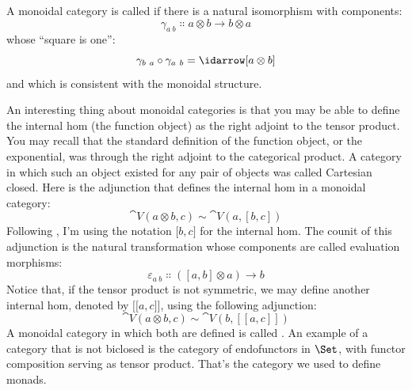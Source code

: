 \begin{figure}[H]
\centering
{}
\end{figure}

\begin{figure}[H]
\centering
{}
\end{figure}

\noindent
A monoidal category is called  if there is a natural
isomorphism with components:
\[\gamma_{a\ b} \Colon a \otimes b \to b \otimes a\]
whose ``square is one'':
\[\gamma_{b\ a} \circ \gamma_{a\ b} = \idarrow[a \otimes b]\]
and which is consistent with the monoidal structure.

An interesting thing about monoidal categories is that you may be able
to define the internal hom (the function object) as the right adjoint to
the tensor product. You may recall that the standard definition of the
function object, or the exponential, was through the right adjoint to
the categorical product. A category in which such an object existed for
any pair of objects was called Cartesian closed. Here is the adjunction
that defines the internal hom in a monoidal category:
\[\cat{V}(a \otimes b, c) \sim \cat{V}(a, [b, c])\]
Following
, I'm using the notation ${[}b, c{]}$ for the internal
hom. The counit of this adjunction is the natural transformation whose
components are called evaluation morphisms:
\[\varepsilon_{a\ b} \Colon ([a, b] \otimes a) \to b\]
Notice that, if the tensor product is not symmetric, we may define
another internal hom, denoted by ${[}{[}a, c{]}{]}$, using the
following adjunction:
\[\cat{V}(a \otimes b, c) \sim \cat{V}(b, [[a, c]])\]
A monoidal category in which both are defined is called . An
example of a category that is not biclosed is the category of
endofunctors in $\Set$, with functor composition serving as tensor
product. That's the category we used to define monads.

